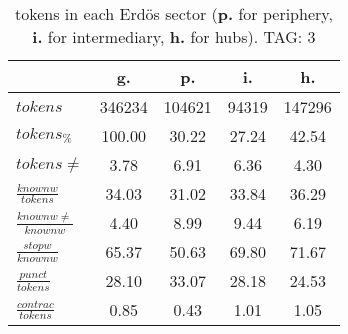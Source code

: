 \begin{table}[h!]
\begin{center}
\begin{tabular}{| l | c | c | c | c |}\hline
 & g. & p. & i. & h. \\\hline
$tokens$ & 346234  & 104621  & 94319  & 147296 \\\hline
$tokens_{\%}$ & 100.00  & 30.22  & 27.24  & 42.54 \\\hline
$tokens \neq$ & 3.78  & 6.91  & 6.36  & 4.30 \\\hline
$\frac{knownw}{tokens}$ & 34.03  & 31.02  & 33.84  & 36.29 \\\hline
$\frac{knownw \neq}{knownw}$ & 4.40  & 8.99  & 9.44  & 6.19 \\\hline
$\frac{stopw}{knownw}$ & 65.37  & 50.63  & 69.80  & 71.67 \\\hline
$\frac{punct}{tokens}$ & 28.10  & 33.07  & 28.18  & 24.53 \\\hline
$\frac{contrac}{tokens}$ & 0.85  & 0.43  & 1.01  & 1.05 \\\hline
\end{tabular}
\caption{tokens in each Erd\"os sector ({{\bf p.}} for periphery, {{\bf i.}} for intermediary, 
    {{\bf h.}} for hubs). TAG: 3}
\end{center}
\end{table}